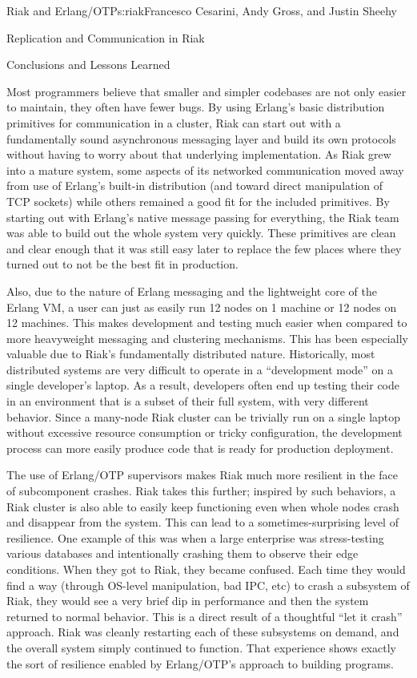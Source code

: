\begin{aosachapter}{Riak and Erlang/OTP}{s:riak}{Francesco Cesarini, Andy Gross, and Justin Sheehy}
\begin{aosasect1}{Replication and Communication in Riak}
\end{aosasect1}

\begin{aosasect1}{Conclusions and Lessons Learned}

Most programmers believe that smaller and simpler codebases are not
only easier to maintain, they often have fewer bugs.  By using
Erlang's basic distribution primitives for communication in a cluster,
Riak can start out with a fundamentally sound asynchronous messaging
layer and build its own protocols without having to worry about that
underlying implementation. As Riak grew into a mature system, some
aspects of its networked communication moved away from use of Erlang's
built-in distribution (and toward direct manipulation of TCP sockets)
while others remained a good fit for the included primitives.  By
starting out with Erlang's native message passing for everything, the
Riak team was able to build out the whole system very quickly.  These
primitives are clean and clear enough that it was still easy later to
replace the few places where they turned out to not be the best fit in
production.

Also, due to the nature of Erlang messaging and the lightweight core
of the Erlang VM, a user can just as easily run 12 nodes on 1 machine
or 12 nodes on 12 machines. This makes development and testing much
easier when compared to more heavyweight messaging and clustering
mechanisms. This has been especially valuable due to Riak's
fundamentally distributed nature. Historically, most distributed
systems are very difficult to operate in a ``development mode'' on a
single developer's laptop. As a result, developers often end up
testing their code in an environment that is a subset of their full
system, with very different behavior. Since a many-node Riak cluster
can be trivially run on a single laptop without excessive resource
consumption or tricky configuration, the development process can more
easily produce code that is ready for production deployment.

The use of Erlang/OTP supervisors makes Riak much more resilient in
the face of subcomponent crashes. Riak takes this further; inspired by
such behaviors, a Riak cluster is also able to easily keep functioning
even when whole nodes crash and disappear from the system. This can
lead to a sometimes-surprising level of resilience.  One example of
this was when a large enterprise was stress-testing various databases
and intentionally crashing them to observe their edge conditions.
When they got to Riak, they became confused.  Each time they would
find a way (through OS-level manipulation, bad IPC, etc) to crash a
subsystem of Riak, they would see a very brief dip in performance and
then the system returned to normal behavior. This is a direct result
of a thoughtful ``let it crash'' approach. Riak was cleanly restarting
each of these subsystems on demand, and the overall system simply
continued to function. That experience shows exactly the sort of
resilience enabled by Erlang/OTP's approach to building programs.


\end{aosasect1}
\end{aosachapter}
